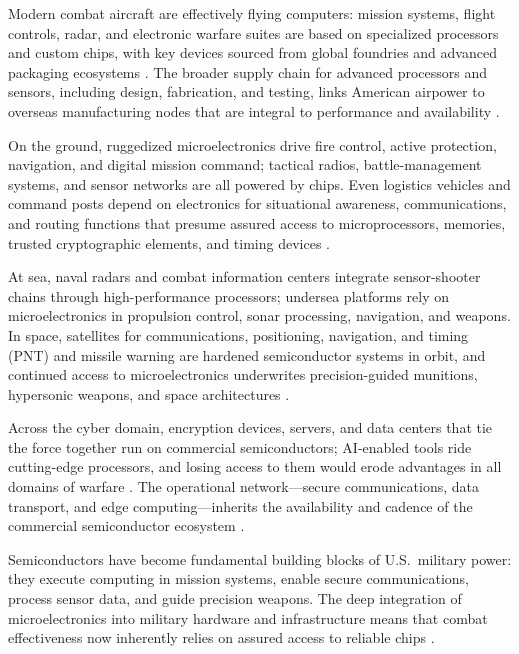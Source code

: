 Modern combat aircraft are effectively flying computers: mission systems, flight controls, radar, and electronic warfare suites are based on specialized processors and custom chips, with key devices sourced from global foundries and advanced packaging ecosystems \parencite{shivakumar_semiconductors_2022,ch5_dod2022_supplychains}. The broader supply chain for advanced processors and sensors, including design, fabrication, and testing, links American airpower to overseas manufacturing nodes that are integral to performance and availability \parencite{shivakumar_semiconductors_2022}.

On the ground, ruggedized microelectronics drive fire control, active protection, navigation, and digital mission command; tactical radios, battle-management systems, and sensor networks are all powered by chips. Even logistics vehicles and command posts depend on electronics for situational awareness, communications, and routing functions that presume assured access to microprocessors, memories, trusted cryptographic elements, and timing devices \parencite{us_army_army_2025}.

At sea, naval radars and combat information centers integrate sensor-shooter chains through high-performance processors; undersea platforms rely on microelectronics in propulsion control, sonar processing, navigation, and weapons. In space, satellites for communications, positioning, navigation, and timing (PNT) and missile warning are hardened semiconductor systems in orbit, and continued access to microelectronics underwrites precision-guided munitions, hypersonic weapons, and space architectures \parencite{goodrich_dont_2025, national_security_administration_us_2016, national_academies_assured_2024}.

Across the cyber domain, encryption devices, servers, and data centers that tie the force together run on commercial semiconductors; AI-enabled tools ride cutting-edge processors, and losing access to them would erode advantages in all domains of warfare \parencite{NationalSecurityCommissiononArtificialIntelligence2021}. The operational network---secure communications, data transport, and edge computing---inherits the availability and cadence of the commercial semiconductor ecosystem \parencite{mondschein_securing_2022}.

Semiconductors have become fundamental building blocks of U.S.\ military power: they execute computing in mission systems, enable secure communications, process sensor data, and guide precision weapons. The deep integration of microelectronics into military hardware and infrastructure means that combat effectiveness now inherently relies on assured access to reliable chips \parencite{ch5_dod2022_supplychains, TheWhiteHouse2021}.

